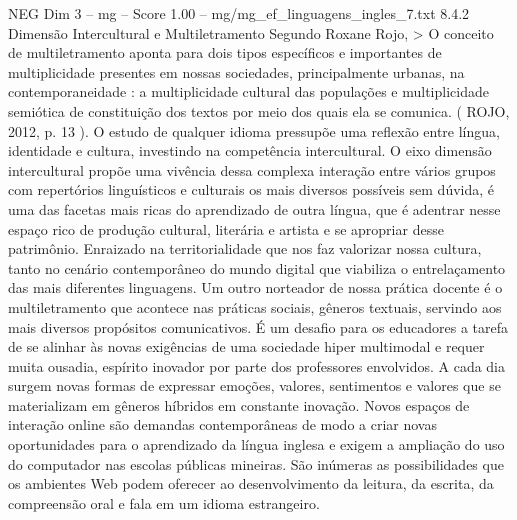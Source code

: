 \begin{textsample}{NEG Dim 3 – mg – Score 1.00 – mg/mg\_ef\_linguagens\_ingles\_7.txt}  \label{ex:f3_neg_027}
8.4.2 Dimensão Intercultural e Multiletramento Segundo Roxane Rojo, > O conceito de multiletramento aponta para dois tipos específicos e importantes de multiplicidade presentes em nossas sociedades, principalmente urbanas, na contemporaneidade : a multiplicidade cultural das populações e multiplicidade semiótica de constituição dos textos por meio dos quais ela se comunica. ( ROJO, 2012, p. 13 ).
O estudo de qualquer idioma pressupõe uma reflexão entre língua, identidade e cultura, investindo na competência intercultural.
O eixo dimensão intercultural propõe uma vivência dessa complexa interação entre vários grupos com repertórios linguísticos e culturais os mais diversos possíveis sem dúvida, é uma das facetas mais ricas do aprendizado de outra língua, que é adentrar nesse espaço rico de produção cultural, literária e artista e se apropriar desse patrimônio.
Enraizado na territorialidade que nos faz valorizar nossa cultura, tanto no cenário contemporâneo do mundo digital que viabiliza o entrelaçamento das mais diferentes linguagens.
Um outro norteador de nossa prática docente é o multiletramento que acontece nas práticas sociais, gêneros textuais, servindo aos mais diversos propósitos comunicativos.
É um desafio para os educadores a tarefa de se alinhar às novas exigências de uma sociedade hiper multimodal e requer muita ousadia, espírito inovador por parte dos professores envolvidos.
A cada dia surgem novas formas de expressar emoções, valores, sentimentos e valores que se materializam em gêneros híbridos em constante inovação.
Novos espaços de interação online são demandas contemporâneas de modo a criar novas oportunidades para o aprendizado da língua inglesa e exigem a ampliação do uso do computador nas escolas públicas mineiras.
São inúmeras as possibilidades que os ambientes Web podem oferecer ao desenvolvimento da leitura, da escrita, da compreensão oral e fala em um idioma estrangeiro.

\end{textsample}
